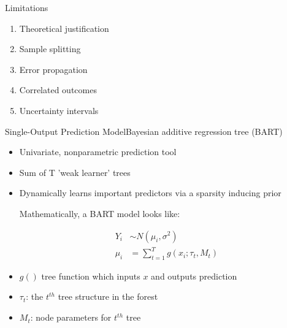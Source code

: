 \documentclass{beamer}
\begin{document}
\begin{frame}{Limitations}
\begin{enumerate}
\item Theoretical justification
\item Sample splitting
\item Error propagation
\item Correlated outcomes
\item Uncertainty intervals
\end{enumerate}
\end{frame}


\begin{frame}{Single-Output Prediction Model}{Bayesian additive regression tree (BART)}
\begin{itemize}
\item Univariate, nonparametric prediction tool
\item Sum of T 'weak learner' trees %
\item Dynamically learns important predictors via a sparsity inducing prior


Mathematically, a BART model looks like:

\begin{align*}
Y_i &\sim N(\mu_i, \sigma^2)\\
\mu_i &= \sum_{t=1}^T g(x_i ; \tau_t, M_t)%
\end{align*}


\item $g()$ tree function which inputs $x$ and outputs prediction
\item $\tau_t$: the $t^{th}$ tree structure in the forest 
\item $M_t$: node parameters for $t^{th}$ tree
\end{itemize}


\end{frame}
\end{document}
